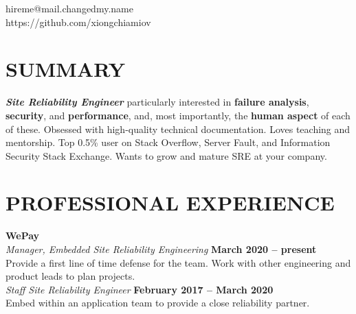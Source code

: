 \documentclass[margin,line]{resume}
\begin{document}
{
    \hfill hireme@mail.changedmy.name       \vspace{0mm}\\\vspace{0mm}%
    \hfill https://github.com/xiongchiamiov \vspace{0mm}\\\vspace{-9mm}%
}

\begin{resume}

    \vspace{-3mm}

    \section{\mysidestyle \textbf{\large{S}\small{UMMARY}}}

    \textbf{\textsl{Site Reliability Engineer}} particularly interested in \textbf{failure analysis}, \textbf{security}, and \textbf{performance}, and, most importantly, the \textbf{human aspect} of each of these.  Obsessed with high-quality technical documentation.  Loves teaching and mentorship.  Top 0.5\% user on Stack Overflow, Server Fault, and Information Security Stack Exchange.  Wants to grow and mature SRE at your company.

    \vspace{-1mm}

\sectionline

    \section{\mysidestyle \textbf{\large{P}\small{ROFESSIONAL} \large{E}\small{XPERIENCE}}}
    
    \textbf{\listing WePay} \vspace{2mm}\\\vspace{1mm}%
    \textsl{Manager, Embedded Site Reliability Engineering} \hfill \textbf{March 2020 -- present}\\
    Provide a first line of time defense for the team.  Work with other engineering and product leads to plan projects.\\
    \textsl{Staff Site Reliability Engineer} \hfill \textbf{February 2017 -- March 2020}\\
    Embed within an application team to provide a close reliability partner.


\end{resume}
\end{document}
